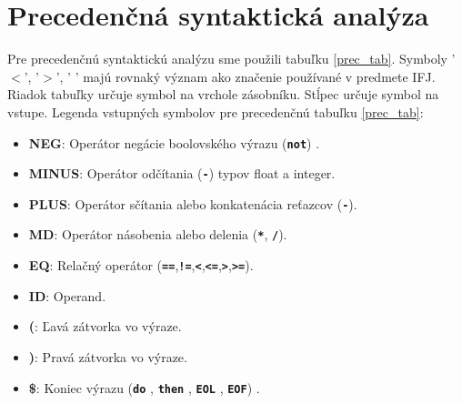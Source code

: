 \documentclass[a4paper, 11pt]{article}
\begin{document}
\section{Precedenčná syntaktická analýza}
Pre precedenčnú syntaktickú analýzu sme použili tabuľku \ref{prec_tab}.  Symboly '$<$', '$>$', ' ' majú rovnaký význam ako značenie používané v predmete IFJ. Riadok tabuľky určuje symbol na vrchole zásobníku. Stĺpec určuje symbol na vstupe.
Legenda vstupných symbolov pre precedenčnú tabuľku \ref{prec_tab}:
\begin{itemize}
	\item{\textbf{NEG}: Operátor negácie boolovského výrazu (\texttt{\textbf{not}}) .}
	\item{\textbf{MINUS}: Operátor odčítania (\texttt{\textbf{-}}) typov float a integer.}
	\item{\textbf{PLUS}: Operátor sčítania alebo konkatenácia reťazcov (\texttt{\textbf{-}}).}
	\item{\textbf{MD}: Operátor násobenia alebo delenia (\texttt{\textbf{*}}, \texttt{\textbf{/}}).}
	\item{\textbf{EQ}: Relačný operátor (\texttt{\textbf{==}},\texttt{\textbf{!=}},\texttt{\textbf{<}},\texttt{\textbf{<=}},\texttt{\textbf{>}},\texttt{\textbf{>=}}).}
	\item{\textbf{ID}: Operand.}
	\item{\textbf{(}: Ľavá zátvorka vo výraze.}
	\item{\textbf{)}: Pravá zátvorka vo výraze.}
	\item{\textbf{\$}: Koniec výrazu (\texttt{\textbf{do}} , \texttt{\textbf{then}} , \texttt{\textbf{EOL}} , \texttt{\textbf{EOF}}) .}
\end{itemize}
\end{document}
